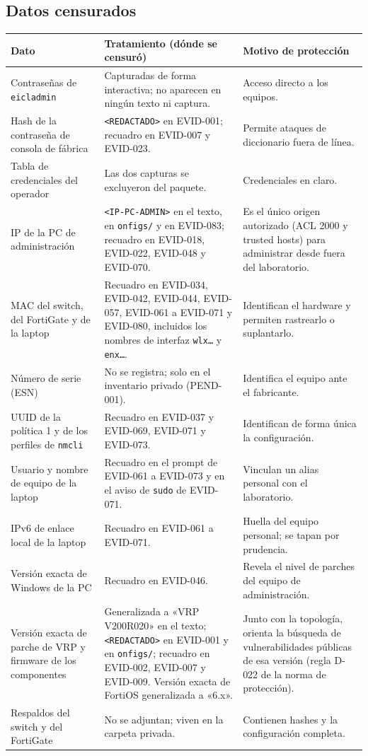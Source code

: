 \documentclass[11pt,a4paper]{article}
\newcommand{\cab}{\rowcolor{light}}
\newcommand{\fn}[1]{\texttt{\fnbreaks#1\fnend}}
\def\fnbreaks#1\fnend{\begingroup\fnactive\scantokens{#1\noexpand}\endgroup}
\gdef\fnactive{\catcode`\-=\active\catcode`\/=\active
  \def-{\char`\-\allowbreak}\def/{\char`\/\allowbreak}\let\_\fnus}
\newcommand{\fnus}{\textunderscore\allowbreak}
\begin{document}
\subsection{Datos censurados}
{\small
\begin{longtable}{L{3.4cm} L{6.0cm} L{5.6cm}}
  \toprule
  \cab\textbf{Dato} & \textbf{Tratamiento (dónde se censuró)} & \textbf{Motivo de protección}\\
  \midrule
  \endhead
  Contraseñas de \texttt{eicladmin} & Capturadas de forma interactiva; no aparecen en ningún texto ni captura. & Acceso directo a los equipos.\\
  Hash de la contraseña de consola de fábrica & \texttt{<REDACTADO>} en EVID-001; recuadro en EVID-007 y EVID-023. & Permite ataques de diccionario fuera de línea.\\
  Tabla de credenciales del operador & Las dos capturas se excluyeron del paquete. & Credenciales en claro.\\
  IP de la PC de administración & \texttt{<IP-PC-ADMIN>} en el texto, en \fn{configs/} y en EVID-083; recuadro en EVID-018, EVID-022, EVID-048 y EVID-070. & Es el único origen autorizado (ACL 2000 y trusted hosts) para administrar desde fuera del laboratorio.\\
  MAC del switch, del FortiGate y de la laptop & Recuadro en EVID-034, EVID-042, EVID-044, EVID-057, EVID-061 a EVID-071 y EVID-080, incluidos los nombres de interfaz \texttt{wlx\ldots} y \texttt{enx\ldots}. & Identifican el hardware y permiten rastrearlo o suplantarlo.\\
  Número de serie (ESN) & No se registra; solo en el inventario privado (PEND-001). & Identifica el equipo ante el fabricante.\\
  UUID de la política 1 y de los perfiles de \texttt{nmcli} & Recuadro en EVID-037 y EVID-069, EVID-071 y EVID-073. & Identifican de forma única la configuración.\\
  Usuario y nombre de equipo de la laptop & Recuadro en el prompt de EVID-061 a EVID-073 y en el aviso de \texttt{sudo} de EVID-071. & Vinculan un alias personal con el laboratorio.\\
  IPv6 de enlace local de la laptop & Recuadro en EVID-061 a EVID-071. & Huella del equipo personal; se tapan por prudencia.\\
  Versión exacta de Windows de la PC & Recuadro en EVID-046. & Revela el nivel de parches del equipo de administración.\\
  Versión exacta de parche de VRP y firmware de los componentes & Generalizada a «VRP V200R020» en el texto; \texttt{<REDACTADO>} en EVID-001 y en \fn{configs/}; recuadro en EVID-002, EVID-007 y EVID-009. Versión exacta de FortiOS generalizada a «6.x». & Junto con la topología, orienta la búsqueda de vulnerabilidades públicas de esa versión (regla D-022 de la norma de protección).\\
  Respaldos del switch y del FortiGate & No se adjuntan; viven en la carpeta privada. & Contienen hashes y la configuración completa.\\
  \bottomrule
\end{longtable}
}
\end{document}
